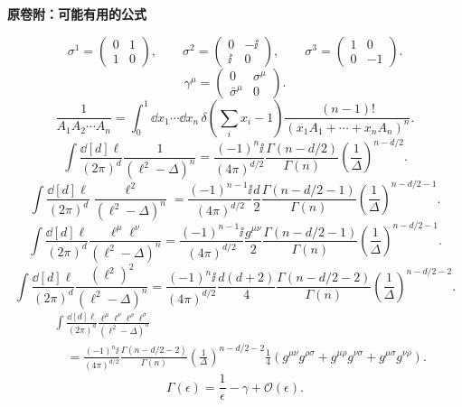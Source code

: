 \vspace{0.5em}
\begin{center}\textbf{原卷附：可能有用的公式}\end{center}

\[
\sigma^1=\begin{pmatrix}0&1\\1&0\end{pmatrix},\qquad
\sigma^2=\begin{pmatrix}0&-\ii\\\ii&0\end{pmatrix},\qquad
\sigma^3=\begin{pmatrix}1&0\\0&-1\end{pmatrix}.
\]
\[
\gamma^\mu=\begin{pmatrix}0&\sigma^\mu\\\bar\sigma^\mu&0\end{pmatrix}.
\]
\[
\frac1{A_1A_2\cdots A_n}
=\int_0^1\dd{x_1}\cdots\dd{x_n}\,
\delta\!\left(\sum_i x_i-1\right)
\frac{(n-1)!}{(x_1A_1+\cdots+x_nA_n)^n}.
\]
\[
\int\frac{\dd[d]{\ell}}{(2\pi)^d}\frac1{(\ell^2-\Delta)^n}
=\frac{(-1)^n\ii}{(4\pi)^{d/2}}
\frac{\Gamma(n-d/2)}{\Gamma(n)}
\left(\frac1\Delta\right)^{n-d/2}.
\]
\[
\int\frac{\dd[d]{\ell}}{(2\pi)^d}\frac{\ell^2}{(\ell^2-\Delta)^n}
=\frac{(-1)^{n-1}\ii}{(4\pi)^{d/2}}\frac d2
\frac{\Gamma(n-d/2-1)}{\Gamma(n)}
\left(\frac1\Delta\right)^{n-d/2-1}.
\]
\[
\int\frac{\dd[d]{\ell}}{(2\pi)^d}\frac{\ell^\mu\ell^\nu}{(\ell^2-\Delta)^n}
=\frac{(-1)^{n-1}\ii}{(4\pi)^{d/2}}\frac{g^{\mu\nu}}2
\frac{\Gamma(n-d/2-1)}{\Gamma(n)}
\left(\frac1\Delta\right)^{n-d/2-1}.
\]
\[
\int\frac{\dd[d]{\ell}}{(2\pi)^d}\frac{(\ell^2)^2}{(\ell^2-\Delta)^n}
=\frac{(-1)^n\ii}{(4\pi)^{d/2}}\frac{d(d+2)}4
\frac{\Gamma(n-d/2-2)}{\Gamma(n)}
\left(\frac1\Delta\right)^{n-d/2-2}.
\]
\[
\begin{aligned}
&\int\frac{\dd[d]{\ell}}{(2\pi)^d}
\frac{\ell^\mu\ell^\nu\ell^\rho\ell^\sigma}{(\ell^2-\Delta)^n}\\
&\quad=\frac{(-1)^n\ii}{(4\pi)^{d/2}}
\frac{\Gamma(n-d/2-2)}{\Gamma(n)}
\left(\frac1\Delta\right)^{n-d/2-2}
\frac14\left(g^{\mu\nu}g^{\rho\sigma}+g^{\mu\rho}g^{\nu\sigma}+g^{\mu\sigma}g^{\nu\rho}\right).
\end{aligned}
\]
\[
\Gamma(\epsilon)=\frac1\epsilon-\gamma+\mathcal O(\epsilon).
\]
